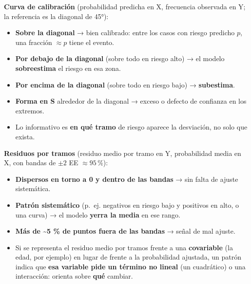 \documentclass[
  letterpaper,
  DIV=11,
  numbers=noendperiod]{scrartcl}
\providecommand{\tightlist}{%
  \setlength{\itemsep}{0pt}\setlength{\parskip}{0pt}}\usepackage{longtable,booktabs,array}
\begin{document}
\begin{tcolorbox}[enhanced jigsaw, breakable, colframe=quarto-callout-tip-color-frame, left=2mm, arc=.35mm, colbacktitle=quarto-callout-tip-color!10!white, toprule=.15mm, colback=white, coltitle=black, rightrule=.15mm, opacitybacktitle=0.6, title=\textcolor{quarto-callout-tip-color}{\faLightbulb}\hspace{0.5em}{Cómo leer los dos gráficos}, titlerule=0mm, toptitle=1mm, bottomtitle=1mm, leftrule=.75mm, bottomrule=.15mm, opacityback=0]

\textbf{Curva de calibración} (probabilidad predicha en X, frecuencia
observada en Y; la referencia es la diagonal de 45°):

\begin{itemize}
\tightlist
\item
  \textbf{Sobre la diagonal} → bien calibrado: entre los casos con
  riesgo predicho \(p\), una fracción \(\approx p\) tiene el evento.
\item
  \textbf{Por debajo de la diagonal} (sobre todo en riesgo alto) → el
  modelo \textbf{sobreestima} el riesgo en esa zona.
\item
  \textbf{Por encima de la diagonal} (sobre todo en riesgo bajo) →
  \textbf{subestima}.
\item
  \textbf{Forma en S} alrededor de la diagonal → exceso o defecto de
  confianza en los extremos.
\item
  Lo informativo es \textbf{en qué tramo} de riesgo aparece la
  desviación, no solo que exista.
\end{itemize}

\textbf{Residuos por tramos} (residuo medio por tramo en Y, probabilidad
media en X, con bandas de \(\pm 2\) EE \(\approx 95\,\%\)):

\begin{itemize}
\tightlist
\item
  \textbf{Dispersos en torno a 0 y dentro de las bandas} → sin falta de
  ajuste sistemática.
\item
  \textbf{Patrón sistemático} (p.~ej. negativos en riesgo bajo y
  positivos en alto, o una curva) → el modelo \textbf{yerra la media} en
  ese rango.
\item
  \textbf{Más de \textasciitilde5 \% de puntos fuera de las bandas} →
  señal de mal ajuste.
\item
  Si se representa el residuo medio por tramos frente a una
  \textbf{covariable} (la edad, por ejemplo) en lugar de frente a la
  probabilidad ajustada, un patrón indica que \textbf{esa variable pide
  un término no lineal} (un cuadrático) o una interacción: orienta sobre
  \textbf{qué} cambiar.
\end{itemize}

\end{tcolorbox}
\end{document}
